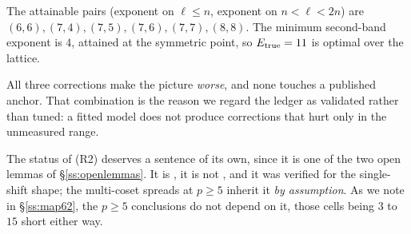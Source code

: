 \begin{center}\end{center}

\begin{finding}\label{find:bandshape}
 The attainable pairs
(exponent on $\ell\le n$, exponent on $n<\ell<2n$) are
$(6,6),(7,4),(7,5),(7,6),(7,7),(8,8)$. The minimum second-band exponent is $4$, attained at
the symmetric point, so $E_{\mathrm{true}}=11$ is optimal over the lattice.
\end{finding}

\begin{center}\end{center}

All three corrections make the picture \emph{worse}, and none touches a published anchor.
That combination is the reason we regard the ledger as validated rather than tuned: a fitted
model does not produce corrections that hurt only in the unmeasured range.

The status of (R2) deserves a sentence of its own, since it is one of the two open lemmas of
\S\ref{ss:openlemmas}. It is , it is not \PROVED{}, and it was verified for the single-shift
shape; the multi-coset spreads at $p\ge5$ inherit it \emph{by assumption}. As we note in
\S\ref{ss:map62}, the $p\ge5$ conclusions do not depend on it, those cells being $3$ to $15$
short either way.

